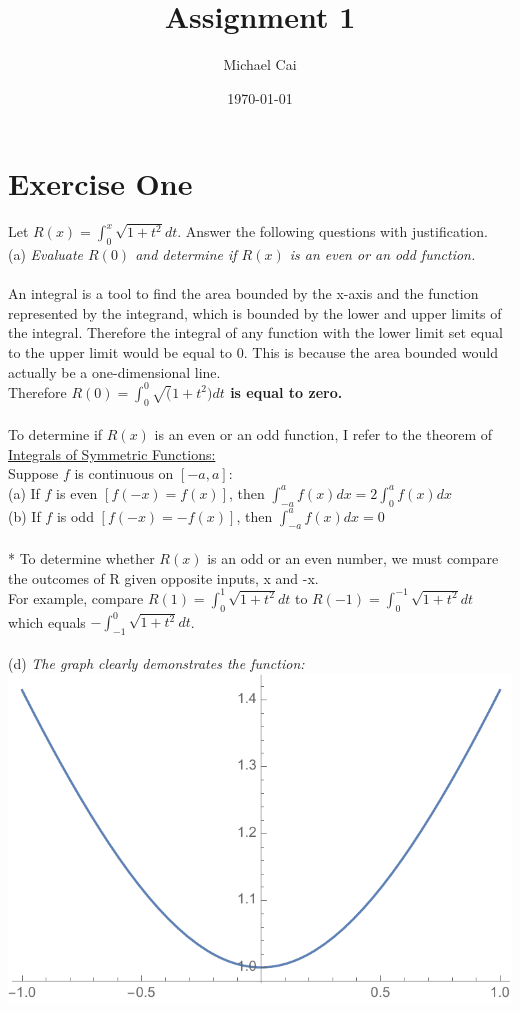 \documentclass[12pt]{article}
\begin{document}
\title{Assignment 1}
\date{\today}
\author{Michael Cai}

\maketitle{}

\section{Exercise One}

Let $R(x) = \int_{0}^{x}\sqrt{1+t^2}dt$. Answer the following questions with justification.\\

(a) \textit{Evaluate $R(0)$ and determine if $R(x)$ is an even or an odd function.}\\
\\An integral is a tool to find the area bounded by the x-axis and the function represented by the integrand, which is bounded by the lower and upper limits of the integral. Therefore the integral of any function with the lower limit set equal to the upper limit would be equal to 0. This is because the area bounded would actually be a one-dimensional line. \\

Therefore \textbf{$R(0) = \int_{0}^{0} \sqrt(1+t^2) dt$ is equal to zero.} \\
\\
To determine if $R(x)$ is an even or an odd function, I refer to the theorem of \underline{Integrals of Symmetric Functions:}
\\
Suppose $f$ is continuous on $[-a,a]$: \\
(a) If $f$ is even $[f(-x) = f(x)]$, then $\int_{-a}^{a}f(x)dx = 2\int_{0}^{a}f(x)dx$ \\
(b) If $f$ is odd $[f(-x) = -f(x)]$, then $\int_{-a}^{a}f(x)dx = 0$ \\
\\*
To determine whether $R(x)$ is an odd or an even number, we must compare the outcomes of R given opposite inputs, x and -x. \\
For example, compare $R(1) = \int_{0}^{1} \sqrt{1+t^2}dt$ to $R(-1) = \int_{0}^{-1} \sqrt{1+t^2}dt$ which equals $-\int_{-1}^{0} \sqrt{1+t^2}dt$. \\
\\
(d) \textit{The graph clearly demonstrates the function:}\\
\includegraphics[width=.55\textwidth]{d_graph.pdf}
\end{document}
